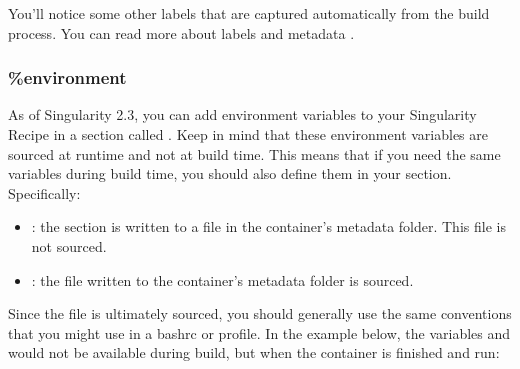 \documentclass[letterpaper,10pt,english]{sphinxmanual}
\begin{document}
You’ll notice some other labels that are captured automatically from the
build process. You can read more about labels and metadata .


\subsubsection{\%environment}
\label{\detokenize{container_recipes:environment}}
\begin{DUlineblock}{0em}
\item[] As of Singularity 2.3, you can add environment variables to your
Singularity Recipe in a section called . Keep in mind that these
environment variables are sourced at runtime and not at build time.
This means that if you need the same variables during build time, you
should also define them in your  section. Specifically:
\end{DUlineblock}
\begin{itemize}
\item {} 
: the  section is written to a file in the container’s
metadata folder. This file is not sourced.

\item {} 
: the file written to the container’s metadata
folder is sourced.

\end{itemize}

Since the file is ultimately sourced, you should generally use the same
conventions that you might use in a bashrc or profile. In the example
below, the variables  and  would not be available during build, but when
the container is finished and run:
\end{document}
